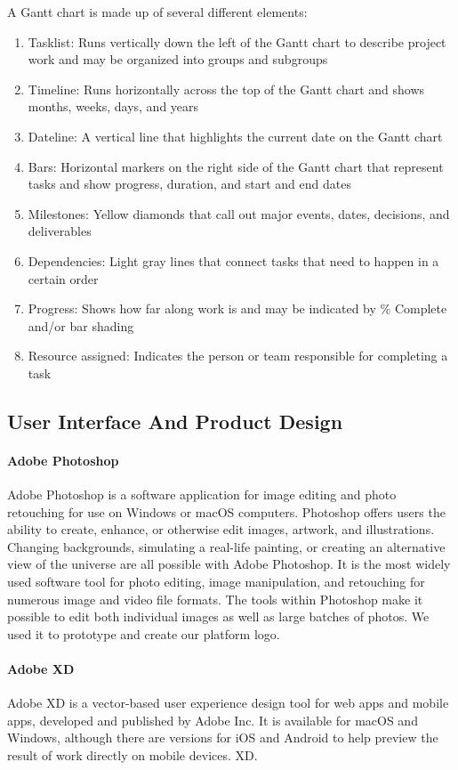 A Gantt chart is made up of several different elements:
\begin{enumerate}
      \item
            Tasklist: Runs vertically down the left of the Gantt chart to describe project work and may be organized into groups and subgroups
      \item
            Timeline: Runs horizontally across the top of the Gantt chart and shows months, weeks, days, and years
      \item
            Dateline: A vertical line that highlights the current date on the Gantt chart
      \item
            Bars: Horizontal markers on the right side of the Gantt chart that represent tasks and show progress, duration, and start and end dates
      \item
            Milestones: Yellow diamonds that call out major events, dates, decisions, and deliverables
      \item
            Dependencies: Light gray lines that connect tasks that need to happen in a certain order
      \item
            Progress: Shows how far along work is and may be indicated by \% Complete and/or bar shading
      \item
            Resource assigned: Indicates the person or team responsible for completing a task
\end{enumerate}


\subsection{User Interface And Product Design}
\paragraph*{Adobe Photoshop}
Adobe Photoshop is a software application for image editing and photo retouching for use on Windows or macOS computers. Photoshop offers users the ability to create, enhance, or otherwise edit images, artwork, and illustrations. Changing backgrounds, simulating a real-life painting, or creating an alternative view of the universe are all possible with Adobe Photoshop. It is the most widely used software tool for photo editing, image manipulation, and retouching for numerous image and video file formats. The tools within Photoshop make it possible to edit both individual images as well as large batches of photos.
We used it to prototype and create our platform logo.
\paragraph*{Adobe XD}
Adobe XD is a vector-based user experience design tool for web apps and mobile apps, developed and published by Adobe Inc. It is available for macOS and Windows, although there are versions for iOS and Android to help preview the result of work directly on mobile devices. XD.






